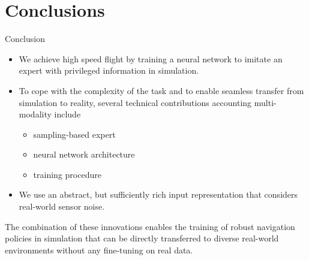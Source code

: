 \documentclass{beamer}
\begin{document}
\section{Conclusions}
\begin{frame}{Conclusion}
	\begin{itemize}
		\item We achieve high speed flight by training a neural network to imitate an expert with privileged information in simulation.
		
		\item To cope with the complexity of the task and to enable seamless transfer from simulation to reality, several technical contributions accounting multi-modality include
		\begin{itemize}
			\item sampling-based expert
			\item neural network architecture
			\item training procedure
		\end{itemize} 
		
		\item We use an abstract, but sufficiently rich input representation that considers real-world sensor noise.
	\end{itemize}
	The combination of these innovations enables the training of robust navigation policies in simulation that can be directly transferred to diverse real-world environments without any fine-tuning on real data.
	
\end{frame}
\end{document}
